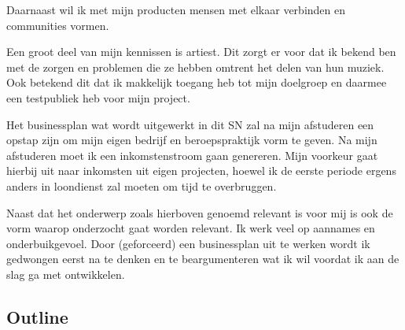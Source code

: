 Daarnaast wil ik met mijn producten mensen met elkaar verbinden en communities vormen. 

Een groot deel van mijn kennissen is artiest. Dit zorgt er voor dat ik bekend ben met de zorgen en problemen die ze hebben omtrent het delen van hun muziek. Ook betekend dit dat ik makkelijk toegang heb tot mijn doelgroep en daarmee een testpubliek heb voor mijn project.

Het businessplan wat wordt uitgewerkt in dit SN zal na mijn afstuderen een opstap zijn om mijn eigen bedrijf en beroepspraktijk vorm te geven. Na mijn afstuderen moet ik een inkomstenstroom gaan genereren. Mijn voorkeur gaat hierbij uit naar inkomsten uit eigen projecten, hoewel ik de eerste periode ergens anders in loondienst zal moeten om tijd te overbruggen.

Naast dat het onderwerp zoals hierboven genoemd relevant is voor mij is ook de vorm waarop onderzocht gaat worden relevant. Ik werk veel op aannames en onderbuikgevoel. Door (geforceerd) een businessplan uit te werken wordt ik gedwongen eerst na te denken en te beargumenteren wat ik wil voordat ik aan de slag ga met ontwikkelen.

\subsection{Outline}
